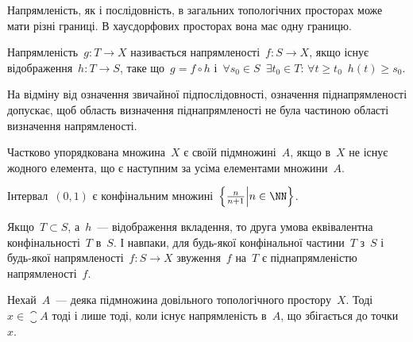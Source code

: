 \begin{remark}
    Напрямленість, як і послідовність, в загальних топологічних просторах може мати різні границі. В хаусдорфових просторах вона має одну границю.
\end{remark}

\begin{definition}
    Напрямленість~$g: T \to X$ називається  напрямленості~$f: S \to X$, якщо існує відображення~$h: T \to S$, таке що~$g = f \circ h$ і~$\forall s_0 \in S$~$\exists t_0 \in T$: $\forall t \ge t_0$~$h(t) \ge s_0$.
\end{definition}

\begin{remark}
    На відміну від означення звичайної підпослідовності, означення піднапрямленості допускає, щоб область визначення піднапрямленості не була частиною області визначення напрямленості.
\end{remark}

\begin{definition}
    Частково упорядкована множина~$X$ є  своїй підмножині~$A$, якщо в~$X$ не існує жодного елемента, що є наступним за усіма елементами множини~$A$.
\end{definition}

\begin{example}
    Інтервал~$(0, 1)$ є конфінальним множині~$\left\{ \frac{n}{n + 1} \middle| n \in \NN \right\}$.
\end{example}

\begin{remark}
    Якщо~$T \subset S$, а~$h$~--- відображення вкладення, то друга умова еквівалентна конфінальності~$T$ в~$S$. І навпаки, для будь-якої конфінальної частини~$T$ з~$S$ і будь-якої напрямленості~$f: S \to X$ звуження~$f$ на~$T$ є піднапрямленістю напрямленості~$f$.
\end{remark}

\begin{theorem}[Бірхгофа]
    Нехай~$A$~--- деяка підмножина довільного топологічного простору~$X$. Тоді~$x \in \closure A$ тоді і лише тоді, коли існує напрямленість в~$A$, що збігається до точки~$x$.
\end{theorem}

